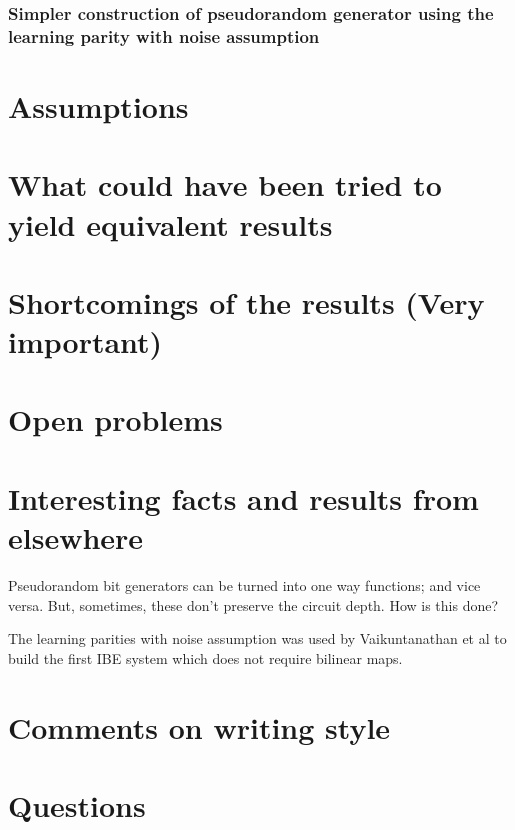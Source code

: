 \documentclass[10pt]{amsart}
\begin{document}
\subsubsection{Simpler construction of pseudorandom generator using the learning parity with noise assumption}

\section{Assumptions}

\section{What could have been tried to yield equivalent results}

\section{Shortcomings of the results (Very important)}

\section{Open problems}


\section{Interesting facts and results from elsewhere}

Pseudorandom bit generators can be turned into one way functions; and vice versa. But, sometimes, these don't preserve the circuit depth. How is this done?

The learning parities with noise assumption was used by Vaikuntanathan et al to build the first IBE system which does not require bilinear maps.

\section{Comments on writing style}


\section{Questions}
\end{document}

